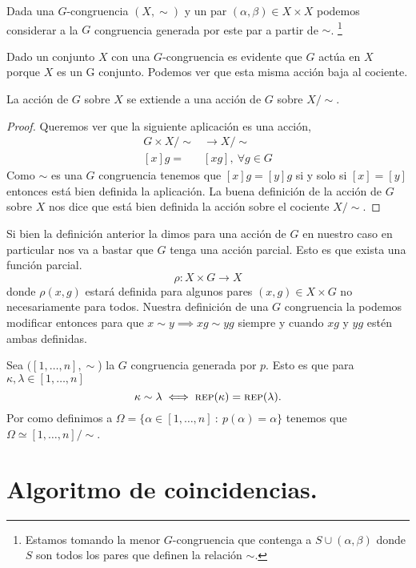 \documentclass[tesis.tex]{subfiles}
\newcommand{\rep}{\textsc{rep}}
\begin{document}
\begin{deff}
	Dada una $G$-congruencia $(X, \sim)$ y un par $(\alpha, \beta) \in X \times X$ podemos considerar a la $G$ congruencia generada por este par a partir de $\sim$.
	\footnote{Estamos tomando la menor $G$-congruencia que contenga a $S \cup (\alpha, \beta)$ donde $S$ son todos los pares que definen la relación $\sim$.}
\end{deff}

Dado un conjunto $X$ con una $G$-congruencia es evidente que $G$ actúa en $X$ porque $X$ es un G conjunto. 
Podemos ver que esta misma acción baja al cociente.
\begin{lema}\label{lema-accion-GCong-cociente}
	La acción de $G$ sobre $X$ se extiende a una acción de $G$ sobre $X / \sim.$
\end{lema}
\begin{proof}
	Queremos ver que la siguiente aplicación es una acción,
	\begin{align*}
	G \times X/\sim &\to X/ \sim \\
	[x]g =& [xg], \ \forall g \in G
	\end{align*}
	 Como $\sim$ es una $G$ congruencia tenemos que $[x]g = [y]g$ si y solo si $[x] = [y]$ entonces está bien definida la aplicación.
	 La buena definición de la acción de $G$ sobre $X$ nos dice que está bien definida la acción sobre el cociente $X/\sim$.
\end{proof}

Si bien la definición anterior la dimos para una acción de $G$ en nuestro caso en particular nos va a bastar que $G$ tenga una acción parcial. 
Esto es que exista una función parcial.
\begin{equation*}
\rho: X \times G \to X
\end{equation*}
donde $\rho(x,g)$ estará definida para algunos pares $(x,g) \in X \times G$ no necesariamente para todos.
Nuestra definición de una $G$ congruencia la podemos modificar entonces para que  $x \sim y \implies xg \sim yg$ siempre y cuando $xg$ y $yg$ estén ambas definidas.





Sea $([1,\dots,n], \sim$) la $G$ congruencia generada por $p$. 
Esto es que para $\kappa, \lambda \in [1,\dots,n]$
\[
\kappa \sim \lambda \iff \rep(\kappa) = \rep (\lambda).
\] 
Por como definimos a $\Omega = \{  \alpha \in [1,\dots,n] \ : \ p(\alpha) = \alpha \}$ tenemos que $\Omega \simeq [1, \dots, n] / \sim$.

\section{Algoritmo de coincidencias.}
\end{document}
